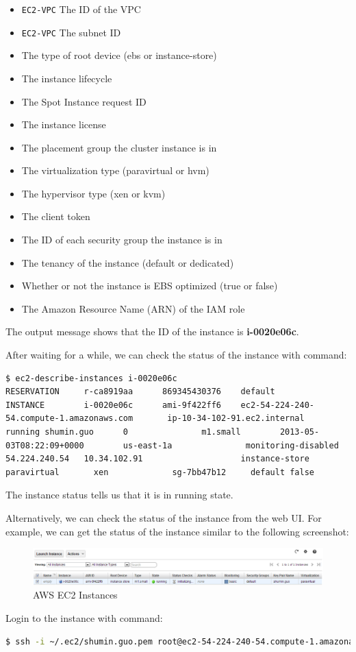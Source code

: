 \begin{itemize}
  \item \verb|EC2-VPC| The ID of the VPC
  \item \verb|EC2-VPC| The subnet ID
  \item The type of root device (ebs or instance-store)
  \item The instance lifecycle
  \item The Spot Instance request ID
  \item The instance license
  \item The placement group the cluster instance is in
  \item The virtualization type (paravirtual or hvm)
  \item The hypervisor type (xen or kvm)
  \item The client token
  \item The ID of each security group the instance is in
  \item The tenancy of the instance (default or dedicated)
  \item Whether or not the instance is EBS optimized (true or false)
  \item The Amazon Resource Name (ARN) of the IAM role
\end{itemize}

The output message shows that the ID of the instance is \textbf{i-0020e06c}.

After waiting for a while, we can check the status of the instance with command:
\lstset{style=bashstyle}
\begin{lstlisting}
$ ec2-describe-instances i-0020e06c
RESERVATION     r-ca8919aa      869345430376    default
INSTANCE        i-0020e06c      ami-9f422ff6    ec2-54-224-240-54.compute-1.amazonaws.com       ip-10-34-102-91.ec2.internal      running shumin.guo      0               m1.small        2013-05-03T08:22:09+0000        us-east-1a               monitoring-disabled      54.224.240.54   10.34.102.91                    instance-store                                  paravirtual       xen             sg-7bb47b12     default false
\end{lstlisting}

The instance status tells us that it is in running state.

Alternatively, we can check the status of the instance from the web UI. For example, we can get the status of the instance similar to the following screenshot:
\begin{figure}[ht]
  \centering
  \includegraphics[width=.95\textwidth]{figs/5163os_08_21.png}
  \caption{AWS EC2 Instances}\label{fig:aws.ec2.instances}
\end{figure} 
Login to the instance with command:
\lstset{style=bashstyle}
\begin{lstlisting}[language=bash]
$ ssh -i ~/.ec2/shumin.guo.pem root@ec2-54-224-240-54.compute-1.amazonaws.com
\end{lstlisting}

